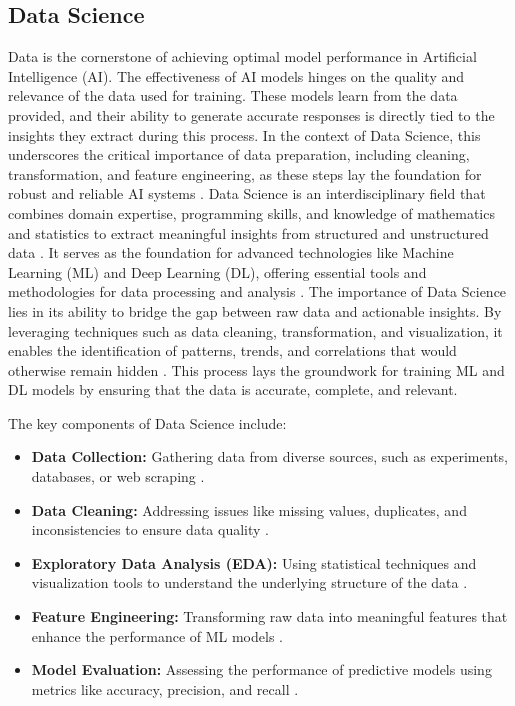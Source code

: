 \subsection{Data Science}
Data is the cornerstone of achieving optimal model performance in Artificial Intelligence (AI). The effectiveness of AI models hinges on the quality and relevance of the data used for training. These models learn from the data provided, and their ability to generate accurate responses is directly tied to the insights they extract during this process. In the context of Data Science, this underscores the critical importance of data preparation, including cleaning, transformation, and feature engineering, as these steps lay the foundation for robust and reliable AI systems \cite{goodfellow2016deep,provost2013data}.
Data Science is an interdisciplinary field that combines domain expertise, programming skills, and knowledge of mathematics and statistics to extract meaningful insights from structured and unstructured data \cite{cathy2017data}. It serves as the foundation for advanced technologies like Machine Learning (ML) and Deep Learning (DL), offering essential tools and methodologies for data processing and analysis \cite{domingos2012few}. The importance of Data Science lies in its ability to bridge the gap between raw data and actionable insights. By leveraging techniques such as data cleaning, transformation, and visualization, it enables the identification of patterns, trends, and correlations that would otherwise remain hidden \cite{james2013introduction}. This process lays the groundwork for training ML and DL models by ensuring that the data is accurate, complete, and relevant.

The key components of Data Science include:
\begin{itemize}
    \item \textbf{Data Collection:} Gathering data from diverse sources, such as experiments, databases, or web scraping \cite{han2011data}.
    \item \textbf{Data Cleaning:} Addressing issues like missing values, duplicates, and inconsistencies to ensure data quality \cite{kotsiantis2006data}.
    \item \textbf{Exploratory Data Analysis (EDA):} Using statistical techniques and visualization tools to understand the underlying structure of the data \cite{tukey1977exploratory}.
    \item \textbf{Feature Engineering:} Transforming raw data into meaningful features that enhance the performance of ML models \cite{guyon2003introduction}.
    \item \textbf{Model Evaluation:} Assessing the performance of predictive models using metrics like accuracy, precision, and recall \cite{fawcett2006introduction}.
\end{itemize}


